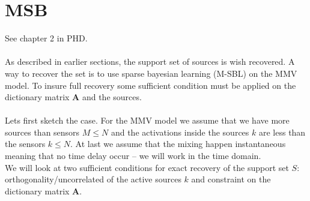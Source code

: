 \section{MSB}
See chapter 2 in PHD.
\\ \\
As described in earlier sections, the support set of sources is wish recovered. A way to recover the set is to use sparse bayesian learning (M-SBL) on the MMV model. To insure full recovery some sufficient condition must be applied on the dictionary matrix $\mathbf{A}$ and the sources. 
\\ \\
Lets first sketch the case. For the MMV model we assume that we have more sources than sensors $M \leq N$ and the activations inside the sources $k$ are less than the sensors $k \leq N$. At last we assume that the mixing happen instantaneous meaning that no time delay occur -- we will work in the time domain.
\\
We will look at two sufficient conditions for exact recovery of the support set $S$: orthogonality/uncorrelated of the active sources $k$ and constraint on the dictionary matrix $\mathbf{A}$.

